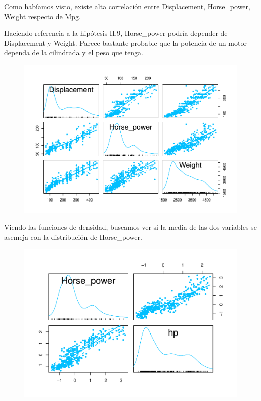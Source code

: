 Como habíamos visto, existe alta correlación entre Displacement, Horse\_power, Weight respecto de Mpg.

\vspace{\baselineskip}

Haciendo referencia a la hipótesis H.9, Horse\_power podría depender de Displacement y Weight. Parece bastante probable que la potencia de un motor dependa de la cilindrada y el peso que tenga.

\begin{figure}[H]\includegraphics[width=.9\linewidth]{img/EDA_files/figure-latex/unnamed-chunk-24-1} \caption{}\end{figure}

Viendo las funciones de densidad, buscamos ver si la media de las dos variables se asemeja con la distribución de Horse\_power.

\begin{figure}[H]\includegraphics[width=.9\linewidth]{img/EDA_files/figure-latex/unnamed-chunk-25-1} \caption{}\end{figure}

